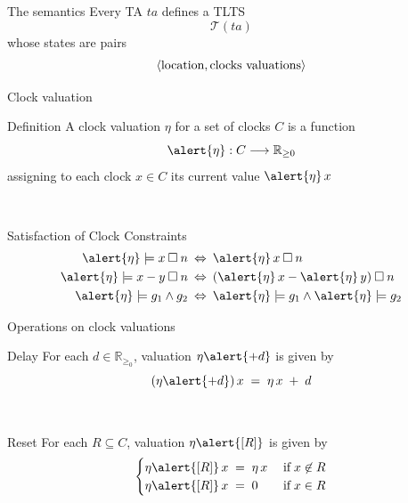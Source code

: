 \documentclass{beamer}
\def\TL#1{\mathcal{T}(#1)}
\begin{document}
\begin{slide}{The semantics}
Every TA $ta$ defines a TLTS 
\begin{equation*}
\TL{ta}
\end{equation*}
whose states are pairs 
\begin{equation*}
\mathopen{\langle}\text{location}, \text{clocks valuations}\mathclose{\rangle}
\end{equation*}
\end{slide}
\begin{slide}{Clock valuation}

\begin{block}{Definition}
A clock valuation \alert{$\eta$} for a set of clocks $C$ is a function 
\begin{equation*}
\fdec{\alert{\eta}}{C}{\mathbb{R}_{\geq 0}}
\end{equation*}
assigning to each clock $x \in C$ its current value $\alert{\eta}\, x$
\end{block}
~\\

\begin{block}{Satisfaction of Clock Constraints}
\begin{align*}
\alert{\eta} \models x \mathbin{\square} n \; & \dimp\; \alert{\eta}\, x \mathbin{\square} n\\
\alert{\eta} \models x-y \mathbin{\square} n \; & \dimp\; (\alert{\eta}\, x - \alert{\eta}\, y) \mathbin{\square} n\\
\alert{\eta} \models g_1 \e g_2 \; & \dimp\; \alert{\eta} \models g_1 \e \alert{\eta} \models g_2
\end{align*}
\end{block}
\end{slide}

\begin{slide}{Operations on clock valuations}
\begin{block}{Delay}
For each $d \in \mathbb{R}_{\geq_0}$, valuation $\eta \alert{+ d}$ is given by
\begin{equation*}
(\eta \alert{+ d})\, x\; =\; \eta\, x\; +\; d
\end{equation*}
\end{block}
~\\

\begin{block}{Reset}
For each $R \subseteq C$, valuation $\eta\alert{[R]}$ is given by
\begin{equation*}
\begin{cases}
\eta\alert{[R]}\, x\; =\; \eta\, x & \; \text{if}\; x \not\in R\\
\eta\alert{[R]}\, x\; =\; 0 & \; \text{if}\; x \in R
\end{cases}
\end{equation*}
\end{block}
\end{slide}
\end{document}

